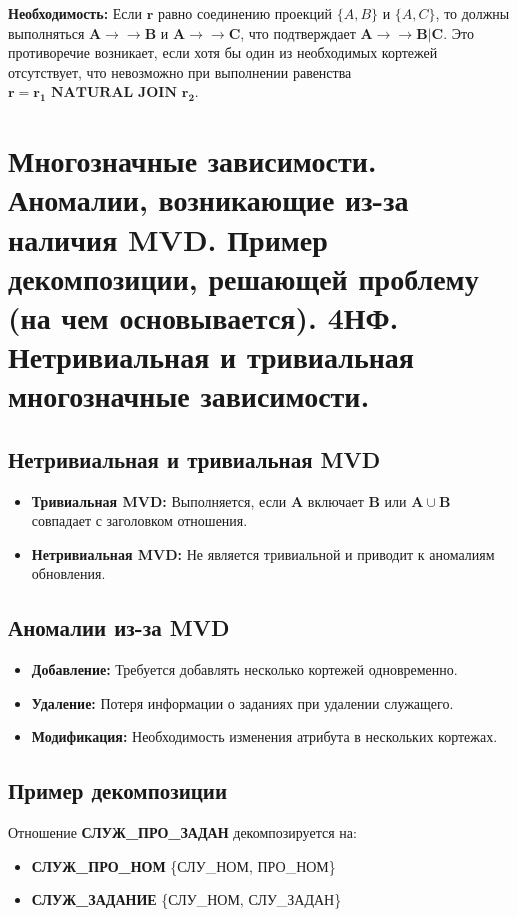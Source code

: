 \documentclass[a4paper,12pt]{article}
\begin{document}
\textbf{Необходимость:}  
Если \(\mathbf{r}\) равно соединению проекций \(\{A, B\}\) и \(\{A, C\}\), то должны выполняться \(\mathbf{A \rightarrow\rightarrow B}\) и \(\mathbf{A \rightarrow\rightarrow C}\), что подтверждает \(\mathbf{A \rightarrow\rightarrow B | C}\). Это противоречие возникает, если хотя бы один из необходимых кортежей отсутствует, что невозможно при выполнении равенства \(\mathbf{r = r_1 \text{ NATURAL JOIN } r_2}\).
    
\section{Многозначные зависимости. Аномалии, возникающие из-за наличия MVD. Пример декомпозиции, решающей проблему (на чем основывается). 4НФ. Нетривиальная и тривиальная многозначные зависимости.}

\subsection{Нетривиальная и тривиальная MVD}

\begin{itemize}
    \item \textbf{Тривиальная MVD:} Выполняется, если \textbf{A} включает \textbf{B} или \(\mathbf{A \cup B}\) совпадает с заголовком отношения.
    \item \textbf{Нетривиальная MVD:} Не является тривиальной и приводит к аномалиям обновления.
\end{itemize}

\subsection{Аномалии из-за MVD}

\begin{itemize}
    \item \textbf{Добавление:} Требуется добавлять несколько кортежей одновременно.
    \item \textbf{Удаление:} Потеря информации о заданиях при удалении служащего.
    \item \textbf{Модификация:} Необходимость изменения атрибута в нескольких кортежах.
\end{itemize}

\subsection{Пример декомпозиции}

Отношение \textbf{СЛУЖ\_ПРО\_ЗАДАН} декомпозируется на:
\begin{itemize}
    \item \textbf{СЛУЖ\_ПРО\_НОМ} \{СЛУ\_НОМ, ПРО\_НОМ\}
    \item \textbf{СЛУЖ\_ЗАДАНИЕ} \{СЛУ\_НОМ, СЛУ\_ЗАДАН\}
\end{itemize}
\end{document}
